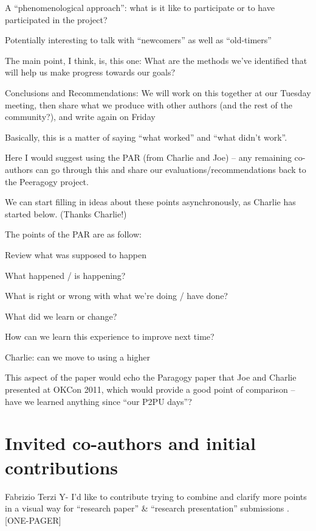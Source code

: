 \documentclass{acm_proc_article-sp}
\begin{document}
    A ``phenomenological approach'': what is it like to participate or to have participated in the project?

        Potentially interesting to talk with ``newcomers'' as well as ``old-timers''

    The main point, I think, is, this one: What are the methods we've identified that will help us make progress towards our goals?

Conclusions and Recommendations: We will work on this together at our Tuesday meeting, then share what we produce with other authors (and the rest of the community?), and write again on Friday

    Basically, this is a matter of saying ``what worked'' and ``what didn't work''.

        Here I would suggest using the PAR (from Charlie and Joe) -- any remaining co-authors can go through this and share our evaluations/recommendations back to the Peeragogy project.

            We can start filling in ideas about these points asynchronously, as Charlie has started below. (Thanks Charlie!)

        The points of the PAR are as follow:

            Review what was supposed to happen

            What happened / is happening?

            What is right or wrong with what we're doing / have done?

            What did we learn or change?

            How can we learn this experience to improve next time?

                Charlie: can we move to using a higher %

        This aspect of the paper would echo the Paragogy paper that Joe and Charlie presented at OKCon 2011, which would provide a good point of comparison -- have we learned anything since ``our P2PU days''?

\section{Invited co-authors and initial contributions}

    Fabrizio Terzi Y- I'd like to contribute trying to combine and clarify more points in a visual way for ``research paper'' \& ``research presentation'' submissions . [ONE-PAGER]
\end{document}
